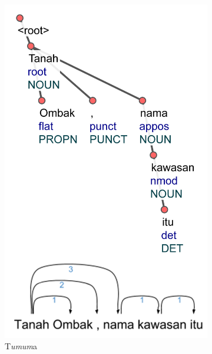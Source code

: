 \documentclass[10pt, a4paper, conference, compsocconf]{IEEEtran}
\begin{document}
\begin{figure}
\centering

\begin{subfigure}{.32\linewidth}
  \centering
  \includegraphics[width=1\linewidth] {pics/ts6841.jpg} 
	\caption{T\textit{umum}a}
	\label{fig:ts6841} 
\end{subfigure}
%
\begin{subfigure}{.46\linewidth}
  \centering

\end{subfigure}
\end{figure}
\end{document}
